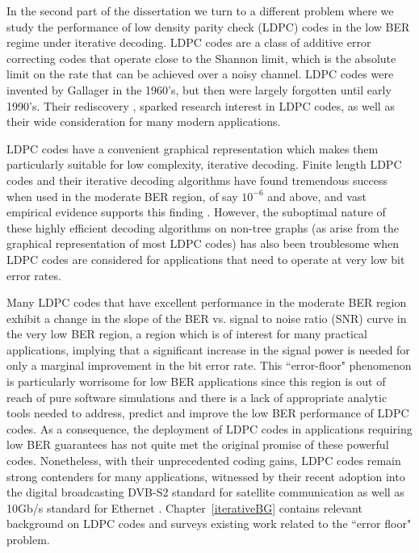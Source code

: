 In the second part of the dissertation we turn to a different
problem where we study the performance of low density parity check
(LDPC) codes in the low BER regime under iterative decoding. LDPC
codes are a class of additive error correcting codes that operate
close to the Shannon limit, which is the absolute limit on the rate
that can be achieved over a noisy channel. LDPC codes were invented
by Gallager \cite{gallager} in the 1960's, but then were largely
forgotten until early 1990's. Their rediscovery \cite{mackay96},
\cite{foss01} sparked research interest in LDPC codes, as well as
their wide consideration for many modern applications.

LDPC codes have a convenient graphical representation which makes
them particularly suitable for low complexity, iterative decoding.
Finite length LDPC codes and their iterative decoding algorithms
have found tremendous success when used in the moderate BER region,
of say $10^{-6}$ and above, and vast empirical evidence supports
this finding \cite{lincostello}. However, the suboptimal nature of
these highly efficient decoding algorithms on non-tree graphs (as
arise from the graphical representation of most LDPC codes) has also
been troublesome when LDPC codes are considered for applications
that need to operate at very low bit error rates.

Many LDPC codes that have excellent performance in the moderate BER
region exhibit a change in the slope of the BER vs. signal to noise
ratio (SNR) curve in the very low BER region, a region which is of
interest for many practical applications, implying that a
significant increase in the signal power is needed for only a
marginal improvement in the bit error rate. This ``error-floor"
phenomenon is particularly worrisome for low BER applications since
this region is out of reach of pure software simulations and there
is a lack of appropriate analytic tools needed to address, predict
and improve the low BER performance of LDPC codes. As a consequence,
the deployment of LDPC codes in applications requiring low BER
guarantees has not quite met the original promise of these powerful
codes. Nonetheless, with their unprecedented coding gains, LDPC
codes remain strong contenders for many applications, witnessed by
their recent adoption into the digital broadcasting DVB-S2 standard
\cite{dvbstandard} for satellite communication as well as 10Gb/s
standard for Ethernet \cite{802standard}. Chapter~\ref{iterativeBG}
contains relevant background on LDPC codes and surveys existing work
related to the ``error floor" problem.

